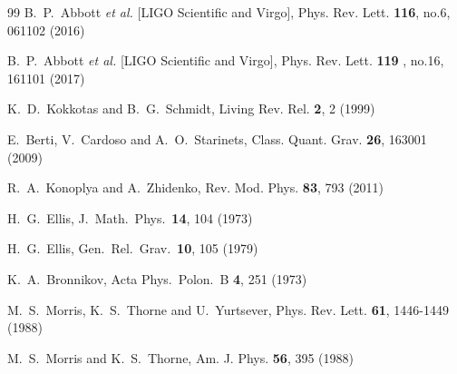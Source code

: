 \documentclass[twocolumn,showpacs,preprintnumbers,amsmath,amssymb,floatfix]{revtex4-1}
\begin{document}
\begin{thebibliography}{99}
B.~P.~Abbott \textit{et al.} [LIGO Scientific and Virgo],
Phys. Rev. Lett. \textbf{116}, no.6, 061102 (2016)

B.~P.~Abbott \textit{et al.} [LIGO Scientific and Virgo],
Phys. Rev. Lett. \textbf{119} , no.16, 161101 (2017)

K.~D.~Kokkotas and B.~G.~Schmidt,
Living Rev. Rel. \textbf{2}, 2 (1999)

E.~Berti, V.~Cardoso and A.~O.~Starinets,
Class. Quant. Grav. \textbf{26}, 163001 (2009)

R.~A.~Konoplya and A.~Zhidenko,
Rev. Mod. Phys. \textbf{83}, 793 (2011)


  H.~G.~Ellis,
  J.\ Math.\ Phys.\  {\bf 14}, 104 (1973)

  H.~G.~Ellis,
  Gen.\ Rel.\ Grav.\  {\bf 10}, 105 (1979)

  K.~A.~Bronnikov,
  Acta Phys.\ Polon.\ B {\bf 4}, 251 (1973)

M.~S.~Morris, K.~S.~Thorne and U.~Yurtsever,
Phys. Rev. Lett. \textbf{61}, 1446-1449 (1988)

M.~S.~Morris and K.~S.~Thorne,
Am. J. Phys. \textbf{56}, 395 (1988)


\end{thebibliography}
\end{document}
